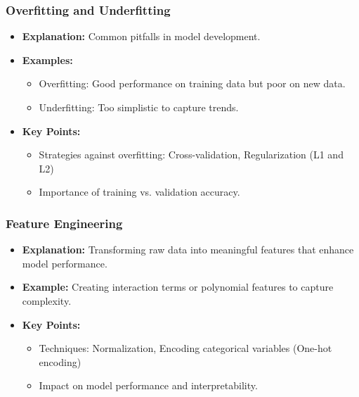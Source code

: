 \documentclass[aspectratio=169]{beamer}
\begin{document}
\begin{frame}[fragile]
    \frametitle{Overfitting and Underfitting}
    \begin{itemize}
        \item \textbf{Explanation:} Common pitfalls in model development.
        \item \textbf{Examples:}
        \begin{itemize}
            \item Overfitting: Good performance on training data but poor on new data.
            \item Underfitting: Too simplistic to capture trends.
        \end{itemize}
        \item \textbf{Key Points:}
        \begin{itemize}
            \item Strategies against overfitting: Cross-validation, Regularization (L1 and L2)
            \item Importance of training vs. validation accuracy.
        \end{itemize}
    \end{itemize}
\end{frame}

\begin{frame}[fragile]
    \frametitle{Feature Engineering}
    \begin{itemize}
        \item \textbf{Explanation:} Transforming raw data into meaningful features that enhance model performance.
        \item \textbf{Example:} Creating interaction terms or polynomial features to capture complexity.
        \item \textbf{Key Points:}
        \begin{itemize}
            \item Techniques: Normalization, Encoding categorical variables (One-hot encoding)
            \item Impact on model performance and interpretability.
        \end{itemize}
    \end{itemize}
\end{frame}
\end{document}
